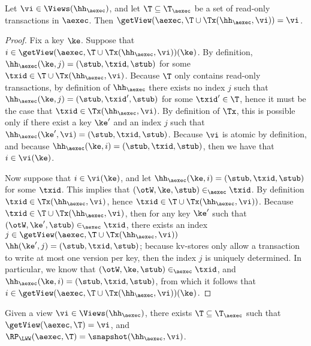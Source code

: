 \begin{proposition}
\label{prop:getview.tx}
Let $\vi \in \Views(\hh_{\aexec})$, and let $\T \subseteq \T_{\aexec}$ be a 
set of read-only transactions in $\aexec$. Then 
$\getView(\aexec, \T \cup \Tx(\hh_{\aexec}, \vi)) = \vi$. 
\end{proposition}

\begin{proof}
Fix a key $\ke$. Suppose that $i \in \getView(\aexec, \T \cup \Tx(\hh_{\aexec}, \vi))(\ke)$. 
By definition, $\hh_{\aexec}(\ke, j) = (\stub, \txid, \stub)$ for some $\txid \in \T \cup \Tx(\hh_{\aexec}, \vi)$. 
Because $\T$ only contains read-only transactions, by definition of $\hh_{\aexec}$ there exists 
no index $j$ such that $\hh_{\aexec}(\ke, j) = (\stub, \txid', \stub)$ for some $\txid' \in \T$, 
hence it must be the case that $\txid \in \Tx(\hh_{\aexec}, \vi)$. By definition of $\Tx$, 
this is possible only if there exist a key $\ke'$ and an index $j$ such that $\hh_{\aexec}(\ke', \vi) = (\stub, \txid, \stub)$. 
Because $\vi$ is atomic by definition, and because $\hh_{\aexec}(\ke, i) = (\stub, \txid, \stub)$, then we have that $i \in \vi(\ke)$. 

Now suppose that $i \in \vi(\ke)$, and let $\hh_{\aexec}(\ke, i) = (\stub, \txid, \stub)$ for some $\txid$. 
This implies that $(\otW, \ke, \stub) \in_{\aexec} \txid$.
By definition $\txid \in \Tx(\hh_{\aexec}, \vi)$, hence $\txid \in \T \cup \Tx(\hh_{\aexec}, \vi))$. 
Because $\txid \in \T \cup \Tx(\hh_{\aexec}, \vi)$, then for any key $\ke'$ such that 
$(\otW, \ke', \stub) \in_{\aexec} \txid$, there exists an index $j \in \getView(\aexec, \T \cup \Tx(\hh_{\aexec}, \vi))$ 
$\hh(\ke', j) = (\stub, \txid, \stub)$; because kv-stores only allow a transaction to write at most one version 
per key, then the index $j$ is uniquely determined. In particular, we know that $(\otW, \ke, \stub) \in_{\aexec} \txid$, 
and $\hh_{\aexec}(\ke, i) = (\stub, \txid, \stub)$, from which it follows that $i \in \getView(\aexec, \T \cup \Tx(\hh_{\aexec}, \vi))(\ke)$.
\end{proof}


\begin{proposition}
\label{prop:compatible.kv2aexec}
Given a view $\vi \in \Views(\hh_{\aexec})$, there exists $\T \subseteq \T_{\aexec}$ 
such that $\getView(\aexec, \T) = \vi$, and $\RP_{\LWW}(\aexec, \T) = \snapshot(\hh_{\aexec}, \vi)$.
\end{proposition}

